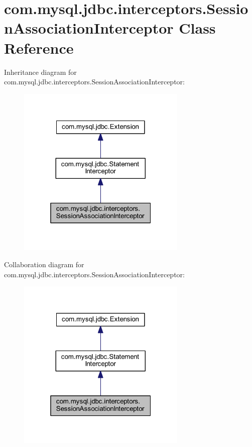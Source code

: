 \hypertarget{classcom_1_1mysql_1_1jdbc_1_1interceptors_1_1_session_association_interceptor}{}\section{com.\+mysql.\+jdbc.\+interceptors.\+Session\+Association\+Interceptor Class Reference}
\label{classcom_1_1mysql_1_1jdbc_1_1interceptors_1_1_session_association_interceptor}


Inheritance diagram for com.\+mysql.\+jdbc.\+interceptors.\+Session\+Association\+Interceptor\+:
\nopagebreak
\begin{figure}[H]
\begin{center}
\leavevmode
\includegraphics[width=229pt]{classcom_1_1mysql_1_1jdbc_1_1interceptors_1_1_session_association_interceptor__inherit__graph}
\end{center}
\end{figure}


Collaboration diagram for com.\+mysql.\+jdbc.\+interceptors.\+Session\+Association\+Interceptor\+:
\nopagebreak
\begin{figure}[H]
\begin{center}
\leavevmode
\includegraphics[width=229pt]{classcom_1_1mysql_1_1jdbc_1_1interceptors_1_1_session_association_interceptor__coll__graph}
\end{center}
\end{figure}

